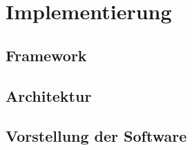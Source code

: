 \section{Implementierung}
\label{ch:implementation}
\subsection{Framework}
\label{ch:framework}
\subsection{Architektur}
\label{ch:architecture}
\subsection{Vorstellung der Software}
\label{ch:presentation}